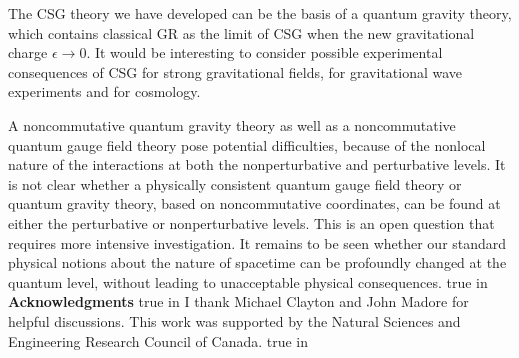 \documentclass[a4paper,10pt]{article}
\begin{document}
The CSG theory we have developed can be the basis of a quantum
gravity theory, which contains classical GR as the limit of CSG when the
new gravitational charge $\epsilon\rightarrow 0$. It would be interesting
to consider possible experimental consequences of CSG for strong
gravitational fields, for gravitational wave experiments and for
cosmology.

A noncommutative quantum gravity theory as well as a
noncommutative quantum gauge field theory pose potential
difficulties, because of the nonlocal nature of the interactions
at both the nonperturbative and perturbative levels. It is not clear whether 
a physically consistent quantum gauge field theory or quantum
gravity theory, based on noncommutative coordinates, can be found
at either the perturbative or nonperturbative levels. This is an
open question that requires more intensive investigation. It
remains to be seen whether our standard physical notions about
the nature of spacetime can be profoundly changed at the quantum
level, without leading to unacceptable physical consequences.
 true in {\bf Acknowledgments}
 true in
I thank Michael Clayton and John Madore for helpful discussions. This
work was supported by the Natural Sciences and Engineering Research Council
of Canada.
 true in
\end{document}
